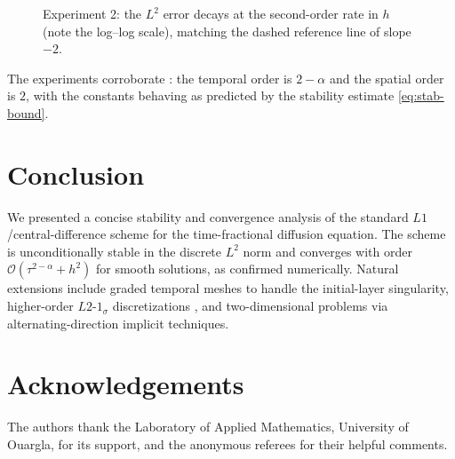 \documentclass[11pt]{ajam}
\begin{document}
\begin{figure}[t]
  \centering
  \caption{Experiment 2: the $L^2$ error decays at the second-order rate
           in $h$ (note the log--log scale), matching the dashed reference
           line of slope $-2$.}
  \label{fig:space}
\end{figure}

The experiments corroborate : the temporal order is
$2-\alpha$ and the spatial order is $2$, with the constants behaving as
predicted by the stability estimate \eqref{eq:stab-bound}.

\section{Conclusion}\label{sec:conclusion}
We presented a concise stability and convergence analysis of the standard
$L1$/central-difference scheme for the time-fractional diffusion equation.
The scheme is unconditionally stable in the discrete $L^2$ norm and
converges with order $\mathcal{O}(\tau^{2-\alpha}+h^2)$ for smooth
solutions, as confirmed numerically. Natural extensions include graded
temporal meshes to handle the initial-layer singularity, higher-order
$L2$-$1_\sigma$ discretizations \citep{Alikhanov2015,GaoSunZhang2014}, and
two-dimensional problems via alternating-direction implicit techniques.

\section*{Acknowledgements}
The authors thank the Laboratory of Applied Mathematics, University of
Ouargla, for its support, and the anonymous referees for their helpful
comments.
\end{document}
